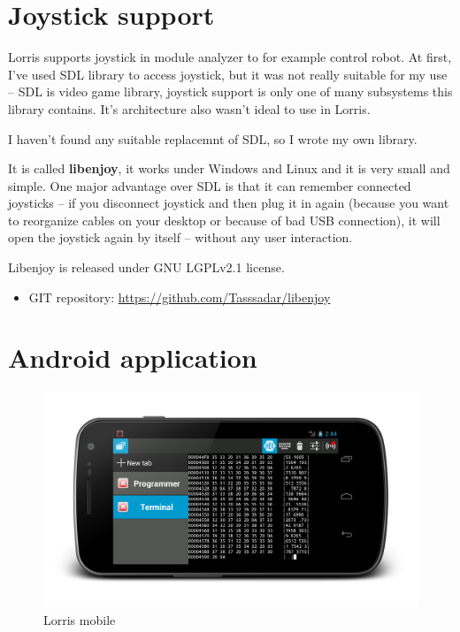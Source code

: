 \documentclass[12pt, a4paper, oneside]{article}
\begin{document}
\section{Joystick support}
Lorris supports joystick in module analyzer to for example control robot. At first, I've used SDL\cite{sdl} library to access joystick, but it was not really suitable for my use -- SDL is video game library, joystick support is only one of many subsystems this library contains. It's architecture also wasn't ideal to use in Lorris.

I haven't found any suitable replacemnt of SDL, so I wrote my own library.

It is called {\bf libenjoy}, it works under Windows and Linux and it is very small and simple. One major advantage over SDL is that it can remember connected joysticks -- if you disconnect joystick and then plug it in again (because you want to reorganize cables on your desktop or because of bad USB connection), it will open the joystick again by itself -- without any user interaction.

Libenjoy is released under GNU LGPLv2.1\cite{lgpl} license.
\begin{itemize}
\item GIT repository: \url{https://github.com/Tasssadar/libenjoy}
\end{itemize}

\newpage
\section{Android application}
\begin{figure}[H]
\begin{center}
\includegraphics[width=\textwidth]{img/mobile.png}
\caption{Lorris mobile}
\end{center}
\end{figure}
\end{document}
